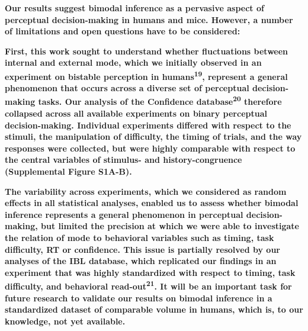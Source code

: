 \documentclass[
]{article}
\begin{document}
\textbf{Our results suggest bimodal inference as a pervasive aspect of
perceptual decision-making in humans and mice. However, a number of
limitations and open questions have to be considered:}

\textbf{First, this work sought to understand whether fluctuations
between internal and external mode, which we initially observed in an
experiment on bistable perception in humans\textsuperscript{19},
represent a general phenomenon that occurs across a diverse set of
perceptual decision-making tasks. Our analysis of the Confidence
database\textsuperscript{20} therefore collapsed across all available
experiments on binary perceptual decision-making. Individual experiments
differed with respect to the stimuli, the manipulation of difficulty,
the timing of trials, and the way responses were collected, but were
highly comparable with respect to the central variables of stimulus- and
history-congruence (Supplemental Figure S1A-B).}

\textbf{The variability across experiments, which we considered as
random effects in all statistical analyses, enabled us to assess whether
bimodal inference represents a general phenomenon in perceptual
decision-making, but limited the precision at which we were able to
investigate the relation of mode to behavioral variables such as timing,
task difficulty, RT or confidence. This issue is partially resolved by
our analyses of the IBL database, which replicated our findings in an
experiment that was highly standardized with respect to timing, task
difficulty, and behavioral read-out\textsuperscript{21}. It will be an
important task for future research to validate our results on bimodal
inference in a standardized dataset of comparable volume in humans,
which is, to our knowledge, not yet available.}
\end{document}
